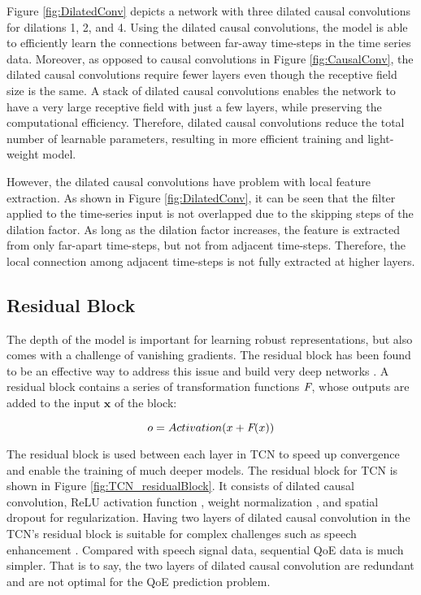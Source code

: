 Figure \ref{fig:DilatedConv} depicts a network with three dilated causal convolutions for dilations 1, 2, and 4.
Using the dilated causal convolutions, the model is able to efficiently learn the connections between far-away time-steps in the time series data.
Moreover, as opposed to causal convolutions in Figure \ref{fig:CausalConv}, the dilated causal convolutions require fewer layers even though the receptive field size is the same.
A stack of dilated causal convolutions enables the network to have a very large receptive field with just a few layers, while preserving the computational efficiency.
Therefore, dilated causal convolutions reduce the total number of learnable parameters, resulting in more efficient training and light-weight model.

However, the dilated causal convolutions have problem with local feature extraction.
As shown in Figure \ref{fig:DilatedConv}, it can be seen that the filter applied to the time-series input is not overlapped due to the skipping steps of the dilation factor.
As long as the dilation factor increases, the feature is extracted from only far-apart time-steps, but not from adjacent time-steps.
Therefore, the local connection among adjacent time-steps is not fully extracted at higher layers.


\subsection{Residual Block}

The depth of the model is important for learning robust representations, but also comes with a challenge of vanishing gradients.
The residual block has been found to be an effective way to address this issue and build very deep networks \cite{Network_Residual1}.
A residual block contains a series of transformation functions $\emph{F}$, whose outputs are added to the input $\mathbf{x}$ of the block:

\begin{equation}
  o = Activation(x+\emph{F}(x))
\end{equation}

The residual block is used between each layer in TCN to speed up convergence and enable the training of much deeper models.
The residual block for TCN is shown in Figure \ref{fig:TCN_residualBlock}.
It consists of dilated causal convolution, ReLU activation function \cite{Network_Relu}, weight normalization \cite{Network_WeightNorm1}, and spatial dropout \cite{Network_Dropout1} for regularization.
Having two layers of dilated causal convolution in the TCN's residual block is suitable for complex challenges such as speech enhancement \cite{Network_TCN}.
Compared with speech signal data, sequential QoE data is much simpler.
That is to say, the two layers of dilated causal convolution are redundant and are not optimal for the QoE prediction problem.

